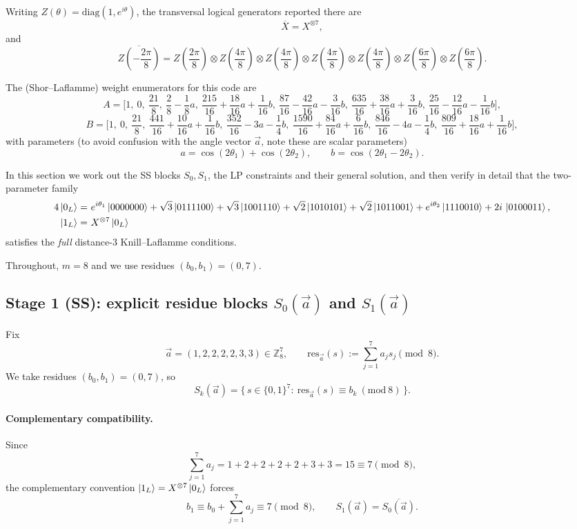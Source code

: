 \documentclass[11pt]{article}
\begin{document}
Writing \(Z(\theta)=\mathrm{diag}(1,e^{i\theta})\), the transversal logical generators reported there are
\[
\overline{X}=X^{\otimes 7},
\]
and
\[
\overline{Z\!\left(-\frac{2\pi}{8}\right)}
=
Z\!\left(\frac{2\pi}{8}\right)\otimes
Z\!\left(\frac{4\pi}{8}\right)\otimes
Z\!\left(\frac{4\pi}{8}\right)\otimes
Z\!\left(\frac{4\pi}{8}\right)\otimes
Z\!\left(\frac{4\pi}{8}\right)\otimes
Z\!\left(\frac{6\pi}{8}\right)\otimes
Z\!\left(\frac{6\pi}{8}\right).
\]

The (Shor--Laflamme) weight enumerators for this code are
\[
A=\Big[
1,\ 0,\ \frac{21}{8},\ \frac{2}{8}-\frac{1}{8}a,\ 
\frac{215}{16}+\frac{18}{16}a+\frac{1}{16}b,\ 
\frac{87}{16}-\frac{42}{16}a-\frac{3}{16}b,\ 
\frac{635}{16}+\frac{38}{16}a+\frac{3}{16}b,\ 
\frac{25}{16}-\frac{12}{16}a-\frac{1}{16}b
\Big],
\]
\[
B=\Big[
1,\ 0,\ \frac{21}{8},\ 
\frac{441}{16}+\frac{10}{16}a+\frac{1}{16}b,\ 
\frac{352}{16}-3a-\frac{1}{4}b,\ 
\frac{1590}{16}+\frac{84}{16}a+\frac{6}{16}b,\ 
\frac{846}{16}-4a-\frac{1}{4}b,\ 
\frac{809}{16}+\frac{18}{16}a+\frac{1}{16}b
\Big],
\]
with parameters (to avoid confusion with the angle vector \(\vec a\), note these are scalar parameters)
\[
a=\cos(2\theta_1)+\cos(2\theta_2),
\qquad
b=\cos(2\theta_1-2\theta_2).
\]

In this section we work out the SS blocks $S_0,S_1$, the LP constraints and their general solution,
and then verify in detail that the two-parameter family
\[
\begin{aligned}
4\ket{0_L}
=&\ e^{i\theta_1}\ket{0000000}
+\sqrt{3}\ket{0111100}
+\sqrt{3}\ket{1001110}
+\sqrt{2}\ket{1010101}
+\sqrt{2}\ket{1011001}
+e^{i\theta_2}\ket{1110010}
+2i\,\ket{0100011},\\
\ket{1_L}=&\ X^{\otimes 7}\ket{0_L}
\end{aligned}
\]
satisfies the \emph{full} distance-$3$ Knill--Laflamme conditions.

Throughout, $m=8$ and we use residues $(b_0,b_1)=(0,7)$.

\subsection{Stage 1 (SS): explicit residue blocks $S_0(\vec a)$ and $S_1(\vec a)$}

Fix
\[
\vec a=(1,2,2,2,2,3,3)\in\mathbb{Z}_8^7,
\qquad
\mathrm{res}_{\vec a}(s):=\sum_{j=1}^7 a_j s_j\pmod 8.
\]
We take residues $(b_0,b_1)=(0,7)$, so
\[
S_k(\vec a)=\{\,s\in\{0,1\}^7:\ \mathrm{res}_{\vec a}(s)\equiv b_k\ (\mathrm{mod}\ 8)\,\}.
\]

\paragraph{Complementary compatibility.}
Since
\[
\sum_{j=1}^7 a_j = 1+2+2+2+2+3+3=15\equiv 7\pmod 8,
\]
the complementary convention $\ket{1_L}=X^{\otimes 7}\ket{0_L}$ forces
\[
b_1\equiv b_0+\sum_{j=1}^7 a_j\equiv 7\pmod 8,
\qquad
S_1(\vec a)=\overline{S_0(\vec a)}.
\]
\end{document}
